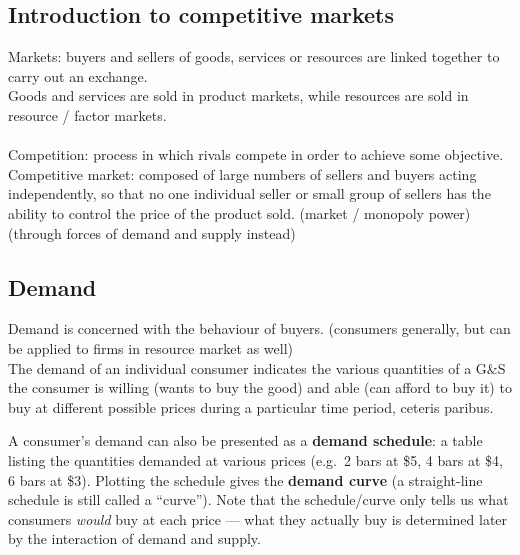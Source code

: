 \documentclass[a4paper,12pt]{article}
\newcommand{\needbold}[1]{\textcolor{red!70!black}{\textbf{#1}}}
\begin{document}
\subsection{Introduction to competitive markets}
Markets: buyers and sellers of goods, services or resources are linked together to carry out an exchange.\\
Goods and services are sold in product markets, while resources are sold in resource / factor markets.\\\\
Competition: process in which rivals compete in order to achieve some objective.\\
Competitive market: composed of large numbers of sellers and buyers acting independently, so that no one individual seller or small group of sellers has the ability to control the price of the product sold. (market / monopoly power) (through forces of demand and supply instead)
\subsection{Demand}
Demand is concerned with the behaviour of buyers. (consumers generally, but can be applied to firms in resource market as well)\\
The demand of an individual consumer indicates the various quantities of a G\&S the consumer is willing (wants to buy the good) and able (can afford to buy it) to buy at different possible prices during a particular time period, ceteris paribus.

A consumer's demand can also be presented as a \needbold{demand schedule}: a table listing the quantities demanded at various prices (e.g.\ 2 bars at \$5, 4 bars at \$4, 6 bars at \$3). Plotting the schedule gives the \needbold{demand curve} (a straight-line schedule is still called a ``curve''). Note that the schedule/curve only tells us what consumers \textit{would} buy at each price --- what they actually buy is determined later by the interaction of demand and supply.
\end{document}
